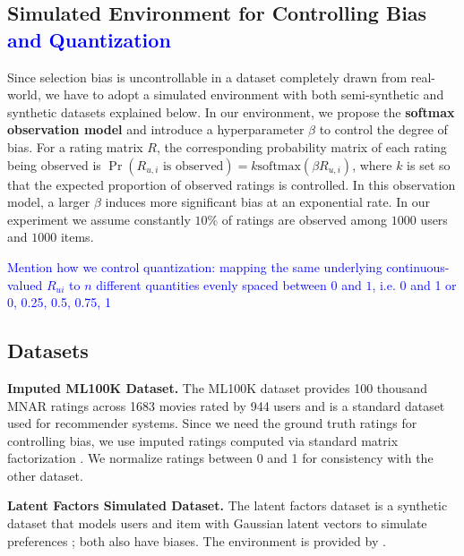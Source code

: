 \documentclass{article}
\begin{document}
\subsection{Simulated Environment for Controlling Bias \textcolor{blue}{and Quantization}}
Since selection bias is uncontrollable in a dataset completely drawn from real-world, we have to adopt a simulated environment \cite{krauth2020offline} with both semi-synthetic and synthetic datasets explained below. In our environment, we propose the \textbf{softmax observation model} and introduce a hyperparameter $\beta$ to control the degree of bias. For a rating matrix $R$, the corresponding probability matrix of each rating being observed is $\Pr(R_{u,i}\text{ is observed}) = k\text{softmax}(\beta R_{u,i})$, where $k$ is set so that the expected proportion of observed ratings is controlled. In this observation model, a larger $\beta$ induces more significant bias at an exponential rate. In our experiment we assume constantly $10\%$ of ratings are observed among $1000$ users and $1000$ items.

\textcolor{blue}{Mention how we control quantization: mapping the same underlying continuous-valued $R_{ui}$ to $n$ different quantities evenly spaced between $0$ and $1$, i.e. 0 and 1 or 0, 0.25, 0.5, 0.75, 1}

\subsection{Datasets}
\textbf{Imputed ML100K Dataset.}
The ML100K dataset provides 100 thousand MNAR ratings across 1683 movies rated by 944 users and is a standard dataset used for recommender systems. Since we need the ground truth ratings for controlling bias, we use imputed ratings computed via standard matrix factorization \cite{krauth2020offline}. We normalize ratings between 0 and 1 for consistency with the other dataset. 

\textbf{Latent Factors Simulated Dataset.}
The latent factors dataset is a synthetic dataset that models users and item with Gaussian latent vectors to simulate preferences \cite{koren2008factorization,koren2009matrix}; both also have biases. The environment is provided by \cite{krauth2020offline}.
\end{document}
